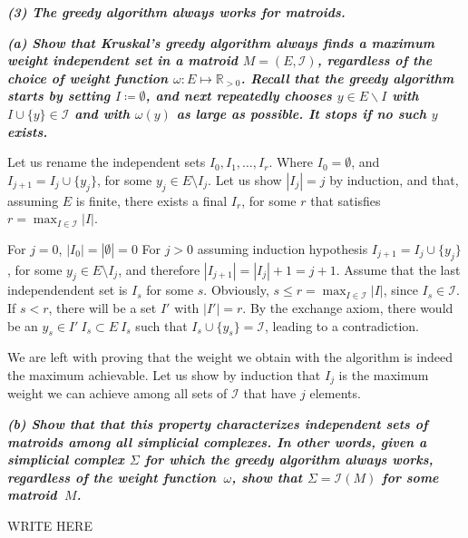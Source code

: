 \textbf{\textit{(3) The greedy algorithm always works for matroids.}}

\hspace{5pt}\textbf{\textit{(a) Show that Kruskal's greedy algorithm always finds a maximum weight independent set in a matroid $M = (E, \mathcal{I})$, regardless of the choice of weight function $\omega : E \mapsto \mathbb{R}_{>0}$. Recall that the greedy algorithm starts by setting $I \coloneqq \emptyset$, and next repeatedly chooses $y \in E \backslash I$ with $I \cup \lbrace y \rbrace \in \mathcal{I}$ and with $\omega(y)$ as large as possible. It stops if no such $y$ exists.}}

\vspace{3pt}

Let us rename the independent sets $I_0, I_1, \ldots, I_r$. Where $I_0 = \emptyset$, and $I_{j+1} = I_j \cup \{y_j\}$, for some $y_j \in E \setminus I_j$. Let us show $|I_j| = j$ by induction, and that, assuming $E$ is finite, there exists a final $I_r$, for some $r$ that satisfies $r = \max_{I \in \mathcal I} |I|$.

For $j = 0$, $|I_0| = |\emptyset| = 0$
For $j > 0$ assuming induction hypothesis $I_{j+1} = I_j \cup \{y_j\}$, for some $y_j \in E \setminus I_j$, and therefore $|I_{j+1}| = |I_j| + 1 = j + 1$. Assume that the last independendent set is $I_s$ for some $s$. Obviously, $s \leq r = \max_{I \in \mathcal I} |I|$, since $I_s \in \mathcal I$. If $s < r$, there will be a set $I'$ with $|I'| = r$. By the exchange axiom, there would be an $y_s \in I' \ I_s \subset E \ I_s$ such that $I_s \cup \{y_s\} = \mathcal I$, leading to a contradiction.

We are left with proving that the weight we obtain with the algorithm is indeed the maximum achievable. Let us show by induction that $I_j$ is the maximum weight we can achieve among all sets of $\mathcal I$ that have $j$ elements. %

\vspace{3pt}

\hspace{5pt}\textbf{\textit{(b) Show that that this property characterizes independent sets of matroids among all simplicial complexes. In other words, given a simplicial complex $\Sigma$ for which the greedy algorithm always works, regardless of the weight function~$\omega$, show that $\Sigma = \mathcal I(M)$ for some matroid~$M$.}}

\vspace{3pt}

WRITE HERE
